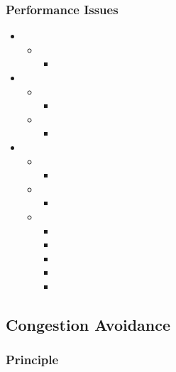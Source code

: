 \subsubsection{Performance Issues}
\begin{itemize}
	\item
	\begin{itemize}
		\item
		\begin{itemize}
			\item
		\end{itemize}
	\end{itemize}
	\item
	\begin{itemize}
		\item
		\begin{itemize}
			\item
		\end{itemize}
		\item
		\begin{itemize}
			\item
		\end{itemize}
	\end{itemize}
	\item
	\begin{itemize}
		\item
		\begin{itemize}
			\item
		\end{itemize}
		\item
		\begin{itemize}
			\item
		\end{itemize}
		\item
		\begin{itemize}
			\item
			\item
			\item
			\item
			\item
		\end{itemize}
	\end{itemize}
\end{itemize}
\subsection{Congestion Avoidance}
\subsubsection{Principle}
